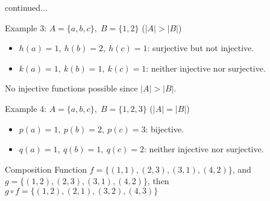 \documentclass[11pt]{beamer}
\theoremstyle{plain}
\begin{document}
\begin{frame}{continued...}
\begin{block}{Example 3: $A=\{a,b,c\},\; B=\{1,2\}$ ($|A|>|B|$)}
\pause 
\begin{itemize}
    \item $h(a)=1,\ h(b)=2,\ h(c)=1$: surjective but not injective.
    \item $k(a)=1,\ k(b)=1,\ k(c)=1$: neither injective nor surjective.
\end{itemize}
No injective functions possible since $|A|>|B|$.
\end{block}
\pause
\begin{block}{Example 4: $A=\{a,b,c\},\; B=\{1,2,3\}$ ($|A|=|B|$)}
\pause
\begin{itemize}
    \item $p(a)=1,\ p(b)=2,\ p(c)=3$: bijective.
    \item $q(a)=1,\ q(b)=1,\ q(c)=2$: neither injective nor surjective.
\end{itemize}
\end{block}

\end{frame}

\begin{frame}{Composition Function}
    $f = \{(1, 1), (2, 3), (3, 1), (4, 2)\}$, and $g = \{(1, 2), (2, 3), (3, 1), (4, 2)\}$, then $g \circ f = \{(1, 2), (2, 1), (3, 2), (4, 3)\}$
\end{frame}
\end{document}
